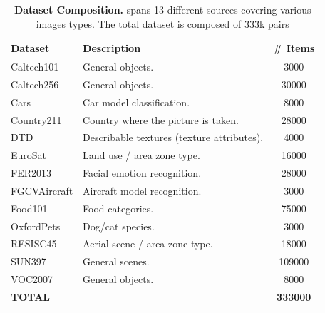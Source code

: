 \begin{table}[ht]
\small
\setlength{\tabcolsep}{6pt}
\renewcommand{\arraystretch}{1.15}
\begin{tabularx}{\textwidth}{l X S[table-format=6.0]}
\toprule
\textbf{Dataset} & \textbf{Description} & {\textbf{\# Items}} \\
\midrule
Caltech101      & General objects.                                                                  & 3000   \\
Caltech256      & General objects.                                                                  & 30000  \\
Cars            & Car model classification.                                                         & 8000   \\
Country211      & Country where the picture is taken.                                               & 28000  \\
DTD             & Describable textures (texture attributes).                                        & 4000   \\
EuroSat         & Land use / area zone type.                                                        & 16000  \\
FER2013         & Facial emotion recognition.                                                       & 28000  \\
FGCVAircraft    & Aircraft model recognition.                                                       & 3000   \\
Food101         & Food categories.                                                                  & 75000  \\
OxfordPets      & Dog/cat species.                                                                  & 3000   \\
RESISC45        & Aerial scene / area zone type.                                                    & 18000  \\
SUN397          & General scenes.                                                                   & 109000 \\
VOC2007         & General objects.                                                                  & 8000   \\
\midrule
\textbf{TOTAL}  &                                                                                   & \textbf{333000} \\
\bottomrule
\end{tabularx}
\caption[\natcap{} dataset composition]{\textbf{\natcap{} Dataset Composition.} \natcap{} spans 13 different sources covering various images types. The total dataset is composed of 333k pairs}
\label{tab:natcap}
\end{table}

